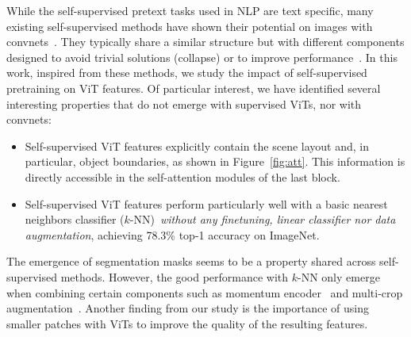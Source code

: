While the self-supervised pretext tasks used in NLP are text specific, many existing self-supervised methods have shown their potential on images with convnets~\cite{caron2020unsupervised, chen2020simple,grill2020bootstrap,he2020momentum}.
They typically share a similar structure but with different components designed to avoid trivial solutions (collapse) or to improve performance~\cite{chen2020exploring}.
In this work, inspired from these methods, we study the impact of self-supervised pretraining on ViT features.
Of particular interest, we have identified several interesting properties that do not emerge with supervised ViTs, nor with convnets:

\begin{itemize}
\item
Self-supervised ViT features explicitly contain the scene layout and, in particular, object boundaries, as shown in Figure~\ref{fig:att}.
This information is directly accessible in the self-attention modules of the last block.
\item
Self-supervised ViT features perform particularly well with a basic nearest neighbors classifier ($k$-NN)~\emph{without any finetuning, linear classifier nor data augmentation}, achieving 78.3\% top-1 accuracy on ImageNet.
\end{itemize}

The emergence of segmentation masks seems to be a property shared across self-supervised methods.
However, the good performance with $k$-NN only emerge when combining certain components such as momentum encoder~\cite{he2020momentum} and multi-crop augmentation~\cite{caron2020unsupervised}.
Another finding from our study is the importance of using smaller patches with ViTs to improve the quality of the resulting features. 

